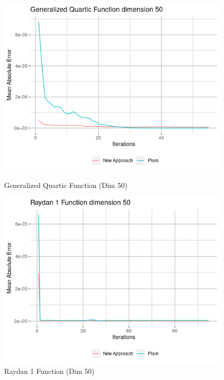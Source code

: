 \documentclass{article}
\begin{document}
\begin{figure}[H]
\begin{minipage}[b]{0.5\linewidth}
		\centering
		\includegraphics[scale=0.5]{plots/Generalized_Quartic_dim50.png} 
		\caption{Generalized Quartic Function (Dim 50)} 
		\vspace{4ex}
	\end{minipage}%
	\begin{minipage}[b]{0.5\linewidth}
		\centering
		\includegraphics[scale=0.5]{plots/Raydan_1_dim50.png}  
		\caption{Raydan 1 Function (Dim 50)} 
		\vspace{4ex}
	\end{minipage} 
\end{figure}
\end{document}
